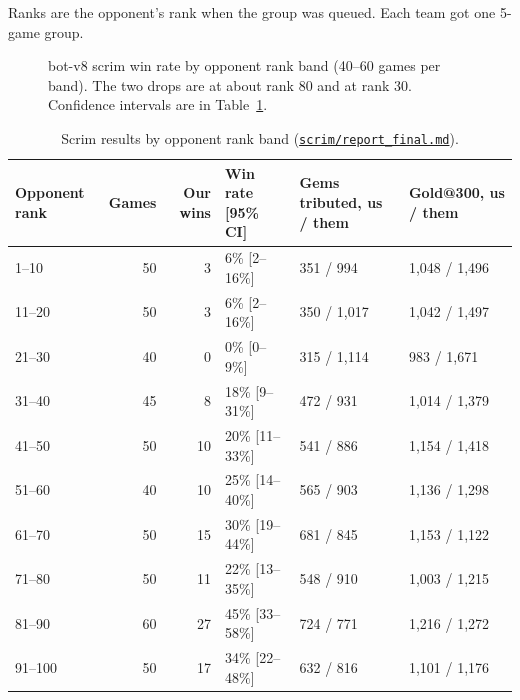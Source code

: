 \documentclass[11pt,a4paper]{article}
\newcommand{\data}{file:///Users/tristanbasri/Desktop/Code/battlecode-scrim-2026-10-25}
\newcommand{\src}[2]{{\small(\href{#1}{\textcolor{cTop}{\texttt{#2}}})}}
\begin{document}
Ranks are the opponent's rank when the group was queued. Each team got one 5-game group.

\begin{figure}[H]
\centering
{}
\caption{bot-v8 scrim win rate by opponent rank band (40--60 games per band). The two drops are at about rank 80 and at rank 30. Confidence intervals are in Table~\ref{tab:bands}.}
\label{fig:bands}
\end{figure}

\begin{table}[H]
\centering\footnotesize\setlength{\tabcolsep}{5pt}
\begin{tabular}{lrrlll}
\toprule
Opponent rank & Games & Our wins & Win rate [95\% CI] & Gems tributed, us / them & Gold@300, us / them \\
\midrule
1--10   & 50 & 3  & 6\% [2--16\%]   & 351 / 994   & 1,048 / 1,496 \\
11--20  & 50 & 3  & 6\% [2--16\%]   & 350 / 1,017 & 1,042 / 1,497 \\
21--30  & 40 & 0  & 0\% [0--9\%]    & 315 / 1,114 & 983 / 1,671 \\
\midrule
31--40  & 45 & 8  & 18\% [9--31\%]  & 472 / 931   & 1,014 / 1,379 \\
41--50  & 50 & 10 & 20\% [11--33\%] & 541 / 886   & 1,154 / 1,418 \\
51--60  & 40 & 10 & 25\% [14--40\%] & 565 / 903   & 1,136 / 1,298 \\
61--70  & 50 & 15 & 30\% [19--44\%] & 681 / 845   & 1,153 / 1,122 \\
71--80  & 50 & 11 & 22\% [13--35\%] & 548 / 910   & 1,003 / 1,215 \\
\midrule
81--90  & 60 & 27 & 45\% [33--58\%] & 724 / 771   & 1,216 / 1,272 \\
91--100 & 50 & 17 & 34\% [22--48\%] & 632 / 816   & 1,101 / 1,176 \\
\bottomrule
\end{tabular}
\caption{Scrim results by opponent rank band \src{\data/scrim/report\_final.md}{scrim/report\_final.md}.}
\label{tab:bands}
\end{table}
\end{document}
